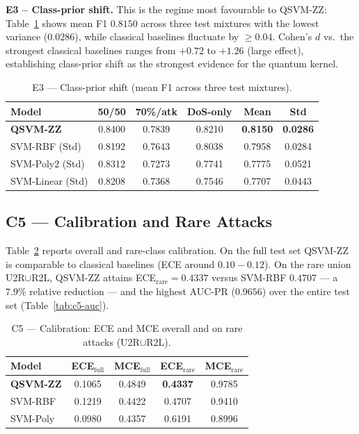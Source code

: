 \documentclass[journal]{IEEEtran}
\newcommand{\ZZ}{\textsc{ZZ}}
\newcommand{\QSVM}{QSVM-\ZZ}
\begin{document}
  \textbf{E3 -- Class-prior shift.} This is the regime most favourable
  to \QSVM{}: Table~\ref{tab:c4-e3} shows mean F1 $0.8150$ across
  three test mixtures with the lowest variance ($0.0286$), while
  classical baselines fluctuate by $\ge 0.04$. Cohen's $d$ vs.\
  the strongest classical baselines ranges from $+0.72$ to $+1.26$
  (large effect), establishing class-prior shift as the strongest
  evidence for the quantum kernel.

  \begin{table}[t]
  \centering
  \caption{E3 --- Class-prior shift (mean F1 across three
    test mixtures).}
  \label{tab:c4-e3}
  \small
  \begin{tabular}{lccccc}
  \toprule
  Model & 50/50 & 70\%/atk & DoS-only & Mean & Std\\\midrule
  \textbf{QSVM-\ZZ{}}     & 0.8400 & 0.7839 & 0.8210 & \textbf{0.8150} & \textbf{0.0286}\\
  SVM-RBF (Std)           & 0.8192 & 0.7643 & 0.8038 & 0.7958 & 0.0284\\
  SVM-Poly2 (Std)         & 0.8312 & 0.7273 & 0.7741 & 0.7775 & 0.0521\\
  SVM-Linear (Std)        & 0.8208 & 0.7368 & 0.7546 & 0.7707 & 0.0443\\
  \bottomrule
  \end{tabular}
  \end{table}

  \subsection{C5 --- Calibration and Rare Attacks}
  Table~\ref{tab:c5-cal} reports overall and rare-class calibration.
  On the full test set \QSVM{} is comparable to classical baselines
  (ECE around $0.10{-}0.12$). On the rare union U2R$\cup$R2L,
  \QSVM{} attains ECE$_{\text{rare}}{=}0.4337$ versus
  SVM-RBF $0.4707$ --- a $7.9\%$ relative reduction --- and the highest
  AUC-PR ($0.9656$) over the entire test set
  (Table~\ref{tab:c5-auc}).

  \begin{table}[t]
  \centering
  \caption{C5 --- Calibration: ECE and MCE overall and on rare
    attacks (U2R$\cup$R2L).}
  \label{tab:c5-cal}
  \small
  \begin{tabular}{lcccc}
  \toprule
  Model & ECE$_{\text{full}}$ & MCE$_{\text{full}}$ & ECE$_{\text{rare}}$ & MCE$_{\text{rare}}$\\\midrule
  \textbf{QSVM-\ZZ{}} & 0.1065 & 0.4849 & \textbf{0.4337} & 0.9785\\
  SVM-RBF             & 0.1219 & 0.4422 & 0.4707 & 0.9410\\
  SVM-Poly            & 0.0980 & 0.4357 & 0.6191 & 0.8996\\
  \bottomrule
  \end{tabular}
  \end{table}
\end{document}
